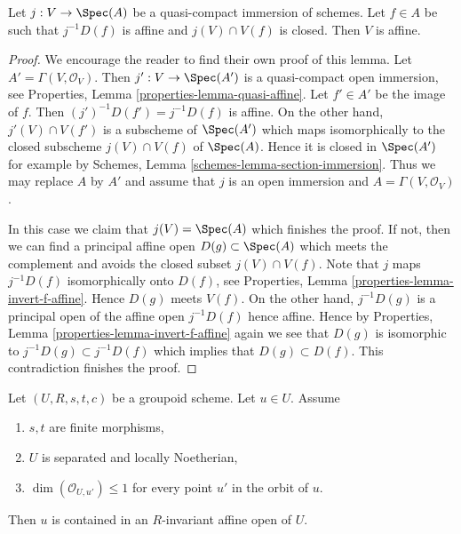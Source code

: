 \begin{lemma}
\label{lemma-get-affine}
Let $j : V \to \Spec(A)$ be a quasi-compact immersion of schemes.
Let $f \in A$ be such that $j^{-1}D(f)$ is affine and $j(V) \cap V(f)$
is closed. Then $V$ is affine.
\end{lemma}

\begin{proof}
We encourage the reader to find their own proof of this lemma.
Let $A' = \Gamma(V, \mathcal{O}_V)$. Then $j' : V \to \Spec(A')$ is a
quasi-compact open immersion, see
Properties, Lemma \ref{properties-lemma-quasi-affine}.
Let $f' \in A'$ be the image of $f$. Then $(j')^{-1}D(f') = j^{-1}D(f)$
is affine. On the other hand, $j'(V) \cap V(f')$ is a subscheme of
$\Spec(A')$ which maps isomorphically to the closed subscheme
$j(V) \cap V(f)$ of $\Spec(A)$. Hence it is closed in $\Spec(A')$
for example by Schemes, Lemma \ref{schemes-lemma-section-immersion}.
Thus we may replace $A$ by $A'$ and assume that $j$ is an open immersion
and $A = \Gamma(V, \mathcal{O}_V)$.

\medskip\noindent
In this case we claim that $j(V) = \Spec(A)$ which finishes the proof.
If not, then we can find a principal affine open $D(g) \subset \Spec(A)$
which meets the complement and avoids the closed subset $j(V) \cap V(f)$.
Note that $j$ maps $j^{-1}D(f)$ isomorphically onto $D(f)$, see
Properties, Lemma \ref{properties-lemma-invert-f-affine}.
Hence $D(g)$ meets $V(f)$. On the other hand, $j^{-1}D(g)$
is a principal open of the affine open $j^{-1}D(f)$ hence affine.
Hence by
Properties, Lemma \ref{properties-lemma-invert-f-affine}
again we see that $D(g)$ is isomorphic to $j^{-1}D(g) \subset j^{-1}D(f)$
which implies that $D(g) \subset D(f)$. This contradiction finishes
the proof.
\end{proof}

\begin{lemma}
\label{lemma-find-affine-codimension-1}
Let $(U, R, s, t, c)$ be a groupoid scheme. Let $u \in U$. Assume
\begin{enumerate}
\item $s, t$ are finite morphisms,
\item $U$ is separated and locally Noetherian,
\item $\dim(\mathcal{O}_{U, u'}) \leq 1$ for every point $u'$
in the orbit of $u$.
\end{enumerate}
Then $u$ is contained in an $R$-invariant affine open of $U$.
\end{lemma}

